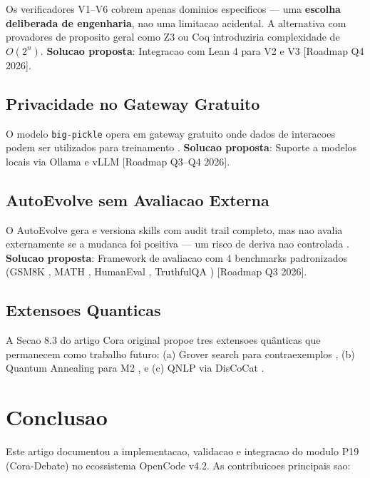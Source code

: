 \documentclass[5p]{elsarticle}
\begin{document}
Os verificadores V1--V6 cobrem apenas dominios especificos --- uma \textbf{escolha deliberada de engenharia}, nao uma limitacao acidental. A alternativa com provadores de proposito geral como Z3 \cite{demoura2008} ou Coq \cite{bertot2004} introduziria complexidade de $O(2^n)$. \textbf{Solucao proposta}: Integracao com Lean 4 \cite{demoura2021} para V2 e V3 [Roadmap Q4 2026].

\subsection{Privacidade no Gateway Gratuito}

O modelo \texttt{big-pickle} opera em gateway gratuito onde dados de interacoes podem ser utilizados para treinamento \cite{carlini2021}. \textbf{Solucao proposta}: Suporte a modelos locais via Ollama e vLLM [Roadmap Q3--Q4 2026].

\subsection{AutoEvolve sem Avaliacao Externa}

O AutoEvolve gera e versiona skills com audit trail completo, mas nao avalia externamente se a mudanca foi positiva --- um risco de deriva nao controlada \cite{amodei2016}. \textbf{Solucao proposta}: Framework de avaliacao com 4 benchmarks padronizados (GSM8K \cite{cobbe2021}, MATH \cite{hendrycks2021math}, HumanEval \cite{chen2021}, TruthfulQA \cite{lin2022}) [Roadmap Q3 2026].

\subsection{Extensoes Quanticas}

A Secao 8.3 do artigo Cora original \cite{cora2026} propoe tres extensoes qu\^anticas que permanecem como trabalho futuro: (a) Grover search para contraexemplos \cite{grover1996}, (b) Quantum Annealing para M2 \cite{kadowaki1998}, e (c) QNLP via DisCoCat \cite{coecke2010,kartsaklis2021}.

\section{Conclusao}

Este artigo documentou a implementacao, validacao e integracao do modulo P19 (Cora-Debate) no ecossistema OpenCode v4.2. As contribuicoes principais sao:
\end{document}
